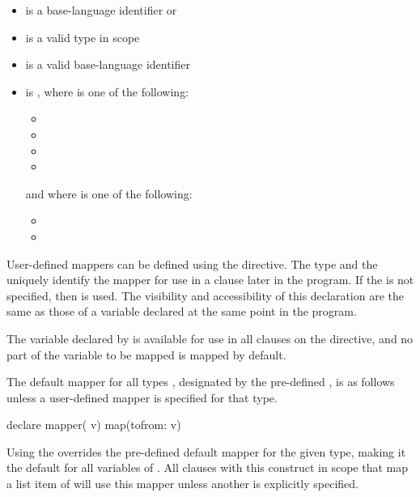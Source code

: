 \begin{itemize}
\item {} is a base-language identifier or 
\item {} is a valid type in scope
\item {} is a valid base-language identifier
\item {} is \plc{[[map-type-modifier[}\pcode{,}\plc{] [map-type-modifier[}\pcode{,}\plc{] ...]] map-type}\pcode{:}\plc{ ] list}\pcode{)}
, where  is one of the following:

\begin{itemize}
\item {}
\item {}
\item {}
\item {}
\end{itemize}

and where  is one of the following:

\begin{itemize}
\item {}
\item {}
\end{itemize}
\end{itemize}

\descr
User-defined mappers can be defined using the  directive.
The type and the  uniquely identify the mapper for use in
a  clause later in the program.  If the  is not
specified, then  is used.  The visibility and accessibility of
this declaration are the same as those of a variable declared at the same point
in the program.

The variable declared by  is available for use in all 
clauses on the directive, and no part of the variable to be mapped is mapped by
default.

The default mapper for all types , designated by the pre-defined
 , is as follows unless a user-defined 
mapper is specified for that type.

\begin{ompSyntax}
declare mapper( v) map(tofrom: v)
\end{ompSyntax}

Using the   overrides the pre-defined
default mapper for the given type, making it the default for all
variables of . All  clauses with this construct in scope
that map a list item of  will use this mapper unless another is
explicitly specified.


